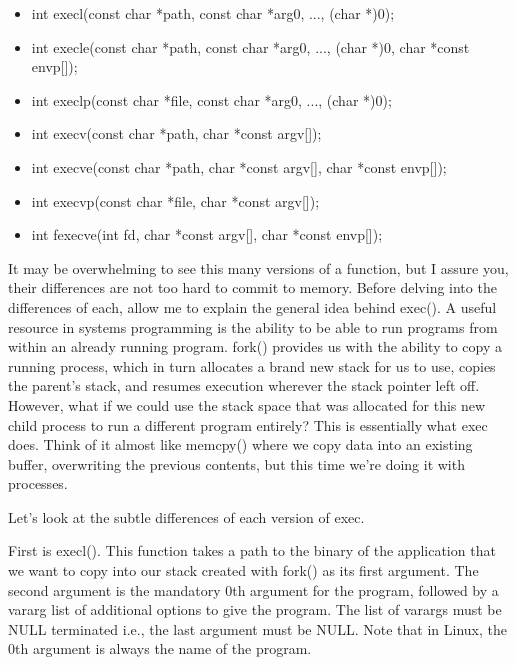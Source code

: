 \documentclass{article}
\begin{document}
\begin{itemize}

\item{int execl(const char *path, const char *arg0, ..., (char *)0);}

\item{int execle(const char *path, const char *arg0, ..., (char *)0, char *const envp[]);}

\item{int execlp(const char *file, const char *arg0, ..., (char *)0);}

\item{int execv(const char *path, char *const argv[]);}

\item{int execve(const char *path, char *const argv[], char *const envp[]);}

\item{int execvp(const char *file, char *const argv[]);}

\item{int fexecve(int fd, char *const argv[], char *const envp[]);}

\end{itemize}

It may be overwhelming to see this many versions of a function, but I assure you, their differences are not
too hard to commit to memory. Before delving into the differences of each, allow me to explain the general
idea behind exec(). A useful resource in systems programming is the ability to be able to run programs from
within an already running program. fork() provides us with the ability to copy a running process, which in
turn allocates a brand new stack for us to use, copies the parent's stack, and resumes execution wherever the
stack pointer left off. However, what if we could use the stack space that was allocated for this new child
process to run a different program entirely? This is essentially what exec does. Think of it almost like
memcpy() where we copy data into an existing buffer, overwriting the previous contents, but this time we're
doing it with processes.

Let's look at the subtle differences of each version of exec.

First is execl(). This function takes a path to the binary of the application that we want to copy into our
stack created with fork() as its first argument. The second argument is the mandatory 0th argument for the
program, followed by a vararg list of additional options to give the program. The list of varargs must be NULL
terminated i.e., the last argument must be NULL. Note that in Linux, the 0th argument is always the name of
the program.
\end{document}
